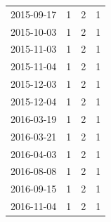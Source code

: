 \begin{tabular}{lrrr}
2015-09-17 & 1 & 2 & 1 \\
2015-10-03 & 1 & 2 & 1 \\
2015-11-03 & 1 & 2 & 1 \\
2015-11-04 & 1 & 2 & 1 \\
2015-12-03 & 1 & 2 & 1 \\
2015-12-04 & 1 & 2 & 1 \\
2016-03-19 & 1 & 2 & 1 \\
2016-03-21 & 1 & 2 & 1 \\
2016-04-03 & 1 & 2 & 1 \\
2016-08-08 & 1 & 2 & 1 \\
2016-09-15 & 1 & 2 & 1 \\
2016-11-04 & 1 & 2 & 1 \\
\bottomrule
\end{tabular}
